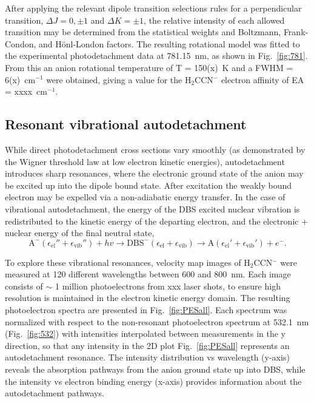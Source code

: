 \documentclass[journal=jpcafh,manuscript=article,layout=onecolumn, 12pt]{achemso}
\begin{document}
After applying the relevant dipole transition selections rules for a perpendicular transition, $\Delta J = 0,\pm 1$ and $\Delta K = \pm1$, the relative intensity of each allowed transition may be determined from the statistical weights and Boltzmann, Frank-Condon, and H\"{o}nl-London factors. The resulting rotational model was fitted to the experimental photodetachment data at 781.15~nm, as shown in Fig.~\ref{fig:781}. From this an anion rotational temperature of T = 150(x)~K and a FWHM = 6(x)~cm$^{-1}$ were obtained, giving a value for the H$_2$CCN$^-$ electron affinity of EA = xxxx~cm$^{-1}$.

\subsection{Resonant vibrational autodetachment}
While direct photodetachment cross sections vary smoothly (as demonstrated by the Wigner threshold law at low electron kinetic energies), autodetachment introduces sharp resonances, where the electronic ground state of the anion may be excited up into the dipole bound state. After excitation the weakly bound electron may be expelled via a non-adiabatic energy transfer. In the case of vibrational autodetachment, the energy of the DBS excited nuclear vibration is redistributed to the kinetic energy of the departing electron, and the electronic + nuclear energy of the final neutral state,
\begin{equation}
	\text{A}^-(\epsilon_{\text{el}}''+\epsilon_{\text{vib}}'') + hv \rightarrow \text{DBS}^-(\epsilon_{\text{el}}+\epsilon_{\text{vib}}) \rightarrow \text{A}(\epsilon_{\text{el}}'+\epsilon_{\text{vib}}') + e^-.
	\label{eq:energy}
\end{equation}

To explore these vibrational resonances, velocity map images of H$_2$CCN$^-$ were measured at 120 different wavelengths between 600 and 800~nm. Each image consists of $\sim$ 1 million photoelectrons from xxx laser shots, to ensure high resolution is maintained in the electron kinetic energy domain. The resulting photoelectron spectra are presented in Fig.~\ref{fig:PESall}. Each spectrum was normalized with respect to the non-resonant photoelectron spectrum at 532.1~nm (Fig.~\ref{fig:532}) with intensities interpolated between measurements in the y direction, so that any intensity in the 2D plot Fig.~\ref{fig:PESall} represents an autodetachment resonance. The intensity distribution vs wavelength (y-axis) reveals the absorption pathways from the anion ground state up into DBS, while the intensity vs electron binding energy (x-axis) provides information about the autodetachment pathways.
\end{document}
